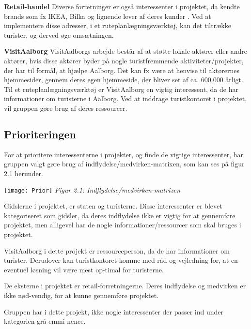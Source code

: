 \textbf{Retail-handel}\newline
Diverse forretninger er også interessenter i projektet, da kendte brands som fx IKEA, Bilka og lignende lever af deres kunder \citep{PengeloseButikker}. Ved at implementere disse adresser, i et ruteplanlægningsværktøj, kan det tiltrække turister, og derved øge omsætningen. 

\textbf{VisitAalborg}\newline
VisitAalborgs arbejde består af at støtte lokale aktører eller andre aktører, hvis disse aktører byder på nogle turistfremmende aktiviteter/projekter, der har til formål, at hjælpe Aalborg. Det kan fx være at henvise til aktørernes hjemmesider, gennem deres egen hjemmeside, der bliver set af ca. 600.000 årligt. \citep{VA}
Til et ruteplanlægningsværktøj er VisitAalborg en vigtig interessent, da de har informationer om turisterne i Aalborg. Ved at inddrage turistkontoret i projektet, vil gruppen gøre brug af deres ressourcer. 

\subsection{Prioriteringen}
For at prioritere interessenterne i projekter, og finde de vigtige interessenter, har gruppen valgt gøre brug af indflydelse/medvirken-matrixen, som kan ses på figur 2.1 herunder.

\texttt{[image: Prior]}
\textit{Figur 2.1: Indflydelse/medvirken-matrixen}\newline
 

Gidslerne i projektet, er staten og turisterne. Disse interessenter er blevet kategoriseret som gidsler, da deres indflydelse ikke er vigtig for at gennemføre projektet, men alligevel har de nogle informationer/ressourcer som skal bruges i projektet.

VisitAalborg i dette projekt er ressourceperson, da de har informationer om turister. Derudover kan turistkontoret komme med råd og vejledning for, at en eventuel løsning vil være mest op-timal for turisterne.   

De eksterne i projektet er retail-forretningerne. Deres indflydelse og medvirken er ikke nød-vendig, for at kunne gennemføre projektet. 

Gruppen har i dette projekt, ikke nogle interessenter der passer ind under kategorien grå emmi-nence. 

